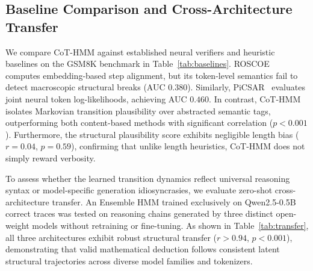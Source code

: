 \documentclass[conference]{IEEEtran}
\begin{document}
\subsection{Baseline Comparison and Cross-Architecture Transfer}

We compare CoT-HMM against established neural verifiers and heuristic baselines on the GSM8K benchmark in Table~\ref{tab:baselines}. ROSCOE~\cite{golovneva2023roscoe} computes embedding-based step alignment, but its token-level semantics fail to detect macroscopic structural breaks (AUC $0.380$). Similarly, PiCSAR~\cite{picsar2025} evaluates joint neural token log-likelihoods, achieving AUC $0.460$. In contrast, CoT-HMM isolates Markovian transition plausibility over abstracted semantic tags, outperforming both content-based methods with significant correlation ($p < 0.001$). Furthermore, the structural plausibility score exhibits negligible length bias ($r=0.04$, $p=0.59$), confirming that unlike length heuristics, CoT-HMM does not simply reward verbosity.

\begin{table}[htbp]
\caption{Comparative Baseline Evaluation on GSM8K}
\label{tab:baselines}
\begin{center}
\end{center}
\end{table}

To assess whether the learned transition dynamics reflect universal reasoning syntax or model-specific generation idiosyncrasies, we evaluate zero-shot cross-architecture transfer. An Ensemble HMM trained exclusively on Qwen2.5-0.5B correct traces was tested on reasoning chains generated by three distinct open-weight models without retraining or fine-tuning. As shown in Table~\ref{tab:transfer}, all three architectures exhibit robust structural transfer ($r > 0.94$, $p < 0.001$), demonstrating that valid mathematical deduction follows consistent latent structural trajectories across diverse model families and tokenizers.
\end{document}
